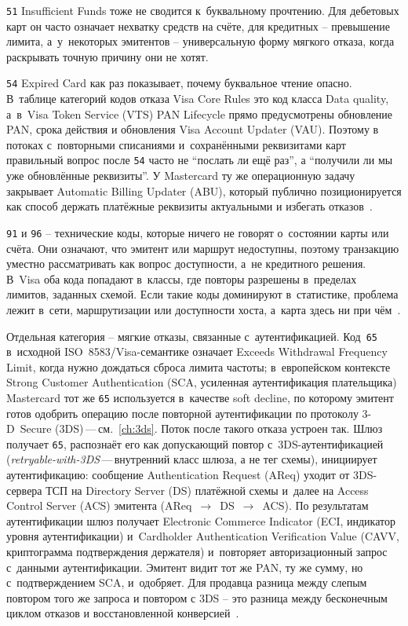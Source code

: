 \texttt{51} Insufficient Funds тоже не сводится к~буквальному прочтению. Для дебетовых карт он часто означает нехватку средств на счёте,
для кредитных -- превышение лимита, а~у~некоторых эмитентов -- универсальную
форму мягкого отказа, когда раскрывать точную причину они не хотят.

\texttt{54} Expired Card как раз показывает, почему буквальное чтение опасно.
В~таблице категорий кодов отказа Visa Core Rules это код класса
Data quality, а~в~Visa Token Service (VTS)
PAN Lifecycle прямо предусмотрены обновление PAN, срока действия и обновления
Visa Account Updater (VAU). Поэтому в потоках с~повторными списаниями и~сохранёнными реквизитами карт правильный вопрос
после \texttt{54} часто не \enquote{послать ли ещё раз}, а
\enquote{получили ли мы уже обновлённые реквизиты}. У Mastercard ту же
операционную задачу закрывает Automatic Billing Updater (ABU), который
публично позиционируется как способ держать платёжные реквизиты
актуальными
и избегать
отказов~\cite{visa-core-rules,visa-vts,visa-vau,mc-abu,mc-bill-pay-solutions}.

\texttt{91} и \texttt{96} -- технические коды, которые ничего не говорят о~состоянии
карты или счёта. Они означают, что эмитент или маршрут недоступны,
поэтому транзакцию уместно рассматривать как вопрос доступности, а~не
кредитного решения. В~Visa оба кода попадают в~классы, где
повторы разрешены в~пределах лимитов, заданных схемой. Если такие коды
доминируют в~статистике, проблема лежит в~сети, маршрутизации или
доступности хоста, а~карта здесь ни при чём~\cite{visa-core-rules}.

Отдельная категория -- мягкие отказы, связанные с~аутентификацией.
Код~\texttt{65} в~исходной ISO~8583/Visa-семантике
означает Exceeds Withdrawal Frequency Limit, когда нужно дождаться
сброса лимита частоты; в~европейском контексте Strong Customer
Authentication (SCA, усиленная аутентификация плательщика)
Mastercard тот же \texttt{65} используется в~качестве soft decline,
по которому эмитент готов одобрить операцию после повторной
аутентификации по протоколу 3-D~Secure (3DS)\,---\,см.~\autoref{ch:3ds}.
Поток после такого отказа устроен так. Шлюз получает \texttt{65},
распознаёт его как допускающий повтор с~3DS-аутентификацией
(\textit{retryable-with-3DS}\,---\,внутренний класс шлюза, а не тег схемы),
инициирует аутентификацию: сообщение Authentication Request
(AReq) уходит от 3DS-сервера ТСП на Directory Server (DS)
платёжной схемы и~далее на Access Control Server (ACS) эмитента
(AReq~$\to$~DS~$\to$~ACS). По результатам аутентификации шлюз
получает Electronic Commerce Indicator (ECI, индикатор уровня
аутентификации) и~Cardholder Authentication Verification Value
(CAVV, криптограмма подтверждения держателя) и~повторяет
авторизационный запрос с~данными аутентификации. Эмитент видит
тот же PAN, ту же сумму, но с~подтверждением SCA, и~одобряет. Для продавца разница
между слепым повтором того же запроса и повтором с 3DS -- это
разница между бесконечным циклом отказов и восстановленной
конверсией~\cite{mc-tpr}.

